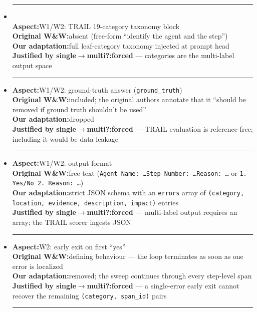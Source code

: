 \begin{itemize}\setlength{\itemsep}{0.4em}

\item \noindent\rule{\linewidth}{0.4pt}\\
      \textbf{Aspect:}\enspace \textsc{W1}/\textsc{W2}: TRAIL 19-category taxonomy block\\
      \textbf{Original W\&W:}\enspace absent (free-form ``identify the agent and the step'')\\
      \textbf{Our adaptation:}\enspace full leaf-category taxonomy injected at prompt head\\
      \textbf{Justified by single$\to$multi?:}\enspace \textbf{forced} --- categories are the multi-label output space\\
      \rule{\linewidth}{0.4pt}

\item \textbf{Aspect:}\enspace \textsc{W1}/\textsc{W2}: ground-truth answer (\texttt{ground\_truth})\\
      \textbf{Original W\&W:}\enspace included; the original authors annotate that it ``should be removed if ground truth shouldn't be used''\\
      \textbf{Our adaptation:}\enspace dropped\\
      \textbf{Justified by single$\to$multi?:}\enspace \textbf{forced} --- TRAIL evaluation is reference-free; including it would be data leakage\\
      \rule{\linewidth}{0.4pt}

\item \textbf{Aspect:}\enspace \textsc{W1}/\textsc{W2}: output format\\
      \textbf{Original W\&W:}\enspace free text (\texttt{Agent Name: \ldots Step Number: \ldots Reason: \ldots} or \texttt{1. Yes/No 2. Reason: \ldots})\\
      \textbf{Our adaptation:}\enspace strict JSON schema with an \texttt{errors} array of \texttt{(category, location, evidence, description, impact)} entries\\
      \textbf{Justified by single$\to$multi?:}\enspace \textbf{forced} --- multi-label output requires an array; the TRAIL scorer ingests JSON\\
      \rule{\linewidth}{0.4pt}

\item \textbf{Aspect:}\enspace \textsc{W2}: early exit on first ``yes''\\
      \textbf{Original W\&W:}\enspace defining behaviour --- the loop terminates as soon as one error is localized\\
      \textbf{Our adaptation:}\enspace removed; the sweep continues through every step-level span\\
      \textbf{Justified by single$\to$multi?:}\enspace \textbf{forced} --- a single-error early exit cannot recover the remaining \texttt{(category, span\_id)} pairs\\
      \rule{\linewidth}{0.4pt}


\end{itemize}
